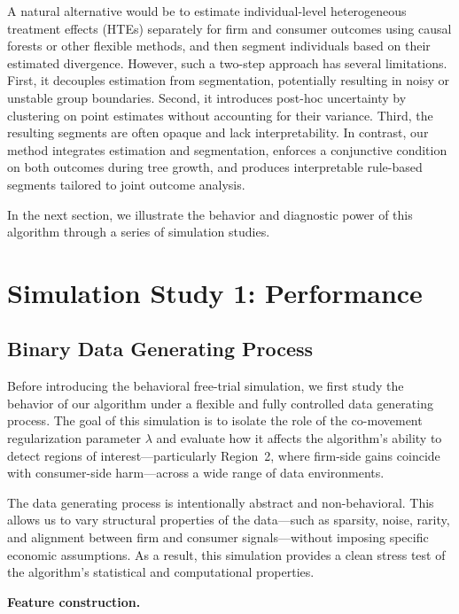 \documentclass[11pt,letterpaper,english]{article}
\theoremstyle{definition}
\theoremstyle{definition}
\begin{document}
\begin{bibunit}
A natural alternative would be to estimate individual-level heterogeneous treatment effects (HTEs) separately for firm and consumer outcomes using causal forests or other flexible methods, and then segment individuals based on their estimated divergence. However, such a two-step approach has several limitations. First, it decouples estimation from segmentation, potentially resulting in noisy or unstable group boundaries. Second, it introduces post-hoc uncertainty by clustering on point estimates without accounting for their variance. Third, the resulting segments are often opaque and lack interpretability. In contrast, our method integrates estimation and segmentation, enforces a conjunctive condition on both outcomes during tree growth, and produces interpretable rule-based segments tailored to joint outcome analysis.

In the next section, we illustrate the behavior and diagnostic power of this algorithm through a series of simulation studies.


\section{Simulation Study 1: Performance}
\label{sec:simulation1}
\subsection{Binary Data Generating Process}
\label{sec:binary-dgp}

Before introducing the behavioral free-trial simulation, we first study the behavior of our algorithm under a flexible and fully controlled data generating process. The goal of this simulation is to isolate the role of the co-movement regularization parameter $\lambda$ and evaluate how it affects the algorithm’s ability to detect regions of interest—particularly Region~2, where firm-side gains coincide with consumer-side harm—across a wide range of data environments.

The data generating process is intentionally abstract and non-behavioral. This allows us to vary structural properties of the data—such as sparsity, noise, rarity, and alignment between firm and consumer signals—without imposing specific economic assumptions. As a result, this simulation provides a clean stress test of the algorithm’s statistical and computational properties.

\vspace{6pt}

\noindent
\textbf{Feature construction.}


\end{bibunit}
\end{document}
